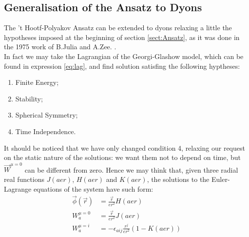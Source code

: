 \documentclass[main.tex]{subfiles}
\begin{document}
\subsection{Generalisation of the Ansatz to Dyons}
The 't Hootf-Polyakov Ansatz can be extended to dyons relaxing a little the hypotheses imposed at the beginning of section \ref{sect:Ansatz}, as it was done in the 1975 work of B.Julia and A.Zee. \cite{Julia:Dyon}.\\
\medskip 
In fact we may take the Lagrangian of the Georgi-Glashow model, which can be found in expression \ref{eq:lag}, and find solution satisfing the following hyptheses:
 \begin{enumerate}
     \item Finite Energy; 
     \item Stability; 
     \item Spherical Symmetry;
     \item Time Independence.
 \end{enumerate}
 It should be noticed that we have only changed condition 4, relaxing our request on the static nature of the solutions: we want them not to depend on time, but $\vec{W}^{\mu=0}$ can be different from zero. Hence we may think that, given three radial real functions $J(aer)$, $H(aer)$ and $K(aer)$, the solutions to the Euler-Lagrange equations of the system have such form:
   \begin{align}
      \vec{\phi}(\vec{r}) &= \frac{\vec{r}}{er^2}H(aer) \\ 
      W^{\mu=0}_{a}&= \frac{\vec{r}}{er^2}J(aer) \\  
      W^{\mu =i}_{a} &= - \epsilon_{aij}\frac{r^j}{er^2}(1 - K(aer)) 
  \end{align}
  
\end{document}
